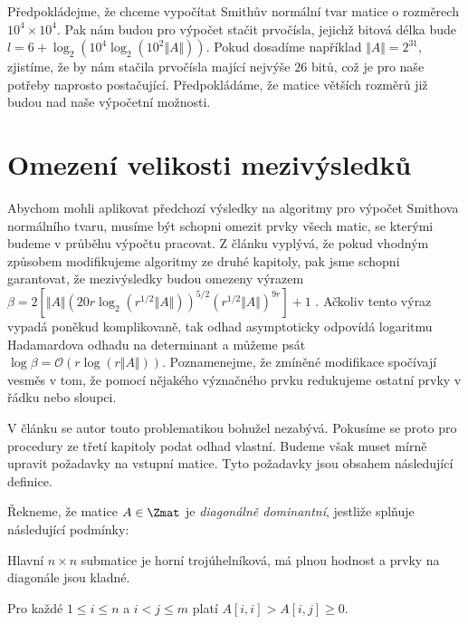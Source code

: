 Předpokládejme, že chceme vypočítat Smithův normální tvar matice o rozměrech
$ 10^4 \times 10^4 $. Pak nám budou pro výpočet stačit prvočísla, jejichž bitová
délka bude $ l = 6 + \log_2(10^4 \log_2(10^2 \Vert A \Vert)) $. Pokud dosadíme
například $ \Vert A \Vert = 2^{31} $, zjistíme, že by nám stačila prvočísla
mající nejvýše $ 26 $ bitů, což je pro naše potřeby naprosto
postačující. Předpokládáme, že matice větších rozměrů již budou nad naše výpočetní
možnosti.



\section{Omezení velikosti mezivýsledků}
Abychom mohli aplikovat předchozí výsledky na algoritmy pro výpočet Smithova
normálního tvaru, musíme být schopni omezit prvky všech matic, se kterými
budeme v průběhu výpočtu pracovat. Z článku \cite{triang} vyplývá, že pokud
vhodným způsobem modifikujeme algoritmy ze druhé kapitoly, pak jsme schopni
garantovat, že mezivýsledky budou omezeny výrazem
$ \beta = 2[\Vert A \Vert (20 r \log_2{ (r^{1/2} \Vert A \Vert) })^{5/2} (r^{1/2} \Vert A \Vert)^{9 r} ] + 1 $
\cite[Theorem 16]{triang}.
Ačkoliv tento výraz vypadá poněkud komplikovaně, tak odhad
asymptoticky odpovídá logaritmu Hadamardova odhadu na determinant a můžeme psát
$ \log{\beta} = \mathcal{O}(r \log{(r \Vert A \Vert)}) $.
Poznamenejme, že zmíněné modifikace spočívají vesměs v tom, že pomocí nějakého
význačného prvku redukujeme ostatní prvky v řádku nebo sloupci.

V článku \cite{SNF_Arne} se autor touto problematikou bohužel nezabývá. Pokusíme
se proto pro procedury ze třetí kapitoly podat odhad vlastní. Budeme však muset
mírně upravit požadavky na vstupní matice. Tyto požadavky jsou obsahem následující
definice.

\begin{defi}
    Řekneme, že matice $ A \in \Zmat $ je \emph{diagonálně dominantní}, jestliže
    splňuje následující podmínky:
    \begin{Cond}
        \item Hlavní $ n \times n $ submatice je horní trojúhelníková, má plnou
            hodnost a prvky na diagonále jsou kladné.
        \item Pro každé $ 1 \leq i \leq n $ a $ i < j \leq m $ platí $ A[i, i] > A[i, j] \geq 0 $.
    \end{Cond}
\end{defi}

